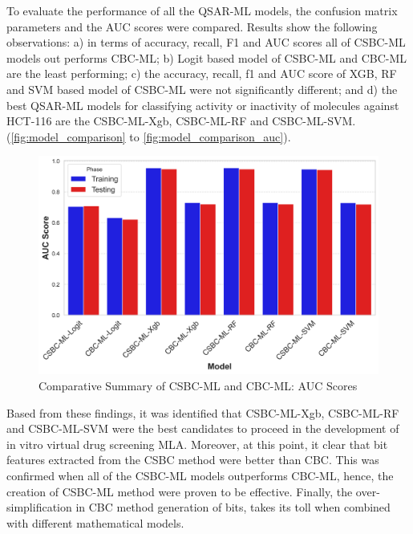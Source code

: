 To evaluate the performance of all the QSAR-ML models, the confusion matrix parameters and the AUC scores were compared. Results show the following observations: a) in terms of accuracy, recall, F1 and AUC scores all of CSBC-ML models out performs CBC-ML; b) Logit based model of CSBC-ML and CBC-ML are the least performing; c) the accuracy, recall, f1 and AUC score of XGB, RF and SVM based model of CSBC-ML were not significantly different; and d) the best QSAR-ML models for classifying activity or inactivity of molecules against HCT-116 are the CSBC-ML-Xgb, CSBC-ML-RF and CSBC-ML-SVM.(\autoref{fig:model_comparison} to \autoref{fig:model_comparison_auc}).       

\begin{figure}[h] %
    \centering
    \includegraphics[scale=0.6]{auc_comparison.png} %
    \caption{Comparative Summary of CSBC-ML and CBC-ML: AUC Scores}
    \label{fig:model_comparison_auc} %
\end{figure}

Based from these findings, it was identified that CSBC-ML-Xgb, CSBC-ML-RF and CSBC-ML-SVM were the best candidates to proceed in the development of in vitro virtual drug screening MLA. Moreover, at this point, it clear that bit features extracted from the CSBC method were better than CBC. This was confirmed when all of the CSBC-ML models outperforms CBC-ML, hence, the creation of CSBC-ML method were proven to be effective. Finally, the over-simplification in CBC method generation of bits, takes its toll when combined with different mathematical models.  